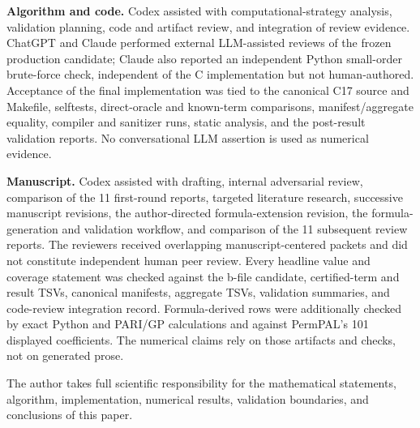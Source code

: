 \documentclass[11pt]{article}
\theoremstyle{definition}
\theoremstyle{remark}
\begin{document}
\noindent\textbf{Algorithm and code.}
Codex assisted with computational-strategy analysis, validation planning,
code and artifact review, and integration of review evidence.  ChatGPT and
Claude performed external LLM-assisted reviews of the frozen production
candidate; Claude also reported an independent Python small-order brute-force
check, independent of the C implementation but not human-authored.  Acceptance
of the final implementation was tied to the canonical C17
source and Makefile, selftests, direct-oracle and known-term comparisons,
manifest/aggregate equality, compiler and sanitizer runs, static analysis,
and the post-result validation reports.  No conversational LLM assertion is
used as numerical evidence.

\noindent\textbf{Manuscript.}
Codex assisted with drafting, internal adversarial review, comparison of the
11 first-round reports, targeted literature research, successive manuscript
revisions, the author-directed formula-extension revision, the
formula-generation and validation workflow, and comparison of the 11
subsequent review reports.
The reviewers received overlapping manuscript-centered packets and did not
constitute independent human peer review.  Every headline value and coverage statement was checked against
the b-file candidate, certified-term and result TSVs, canonical manifests,
aggregate TSVs, validation summaries, and code-review integration record.
Formula-derived rows were additionally checked by exact Python and PARI/GP
calculations and against PermPAL's 101 displayed coefficients.  The numerical
claims rely on those artifacts and checks, not on generated prose.

The author takes full scientific responsibility for the mathematical
statements, algorithm, implementation, numerical results, validation
boundaries, and conclusions of this paper.
\end{document}
